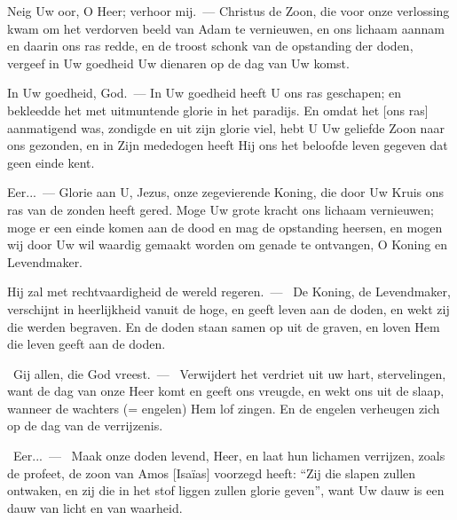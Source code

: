 \documentclass[12pt,twoside,a5paper]{article}
\begin{document}

\begin{halfparskip}
   Neig Uw oor, O Heer; verhoor mij.~--- Christus de Zoon, die voor onze verlossing kwam om het verdorven beeld van Adam te vernieuwen, en ons lichaam aannam en daarin ons ras redde, en de troost schonk van de opstanding der doden, vergeef in Uw goedheid Uw dienaren op de dag van Uw komst.

  In Uw goedheid, God.~--- In Uw goedheid heeft U ons ras geschapen; en bekleedde het met uitmuntende glorie in het paradijs. En omdat het [ons ras] aanmatigend was, zondigde en uit zijn glorie viel, hebt U Uw geliefde Zoon naar ons gezonden, en in Zijn mededogen heeft Hij ons het beloofde leven gegeven dat geen einde kent.

  Eer...~--- Glorie aan U, Jezus, onze zegevierende Koning, die door Uw Kruis ons ras van de zonden heeft gered. Moge Uw grote kracht ons lichaam vernieuwen; moge er een einde komen aan de dood en mag de opstanding heersen, en mogen wij door Uw wil waardig gemaakt worden om genade te ontvangen, O Koning en Levendmaker.
\end{halfparskip}

\begin{halfparskip}
   Hij zal met rechtvaardigheid de wereld regeren.~--- \rr~De Koning, de Levendmaker, verschijnt in heerlijkheid vanuit de hoge, en geeft leven aan de doden, en wekt zij die werden begraven. En de doden staan samen op uit de graven, en loven Hem die leven geeft aan de doden.

  \dd~Gij allen, die God vreest.~--- \rr~Verwijdert het verdriet uit uw hart, stervelingen, want de dag van onze Heer komt en geeft ons vreugde, en wekt ons uit de slaap, wanneer de wachters (= engelen) Hem lof zingen. En de engelen verheugen zich op de dag van de verrijzenis.

  \cc~Eer...~--- \rr~Maak onze doden levend, Heer, en laat hun lichamen verrijzen, zoals de profeet, de zoon van Amos [Isaïas] voorzegd heeft: ``Zij die slapen zullen ontwaken, en zij die in het stof liggen zullen glorie geven'', want Uw dauw is een dauw van licht en van waarheid.
\end{halfparskip}


\end{document}
